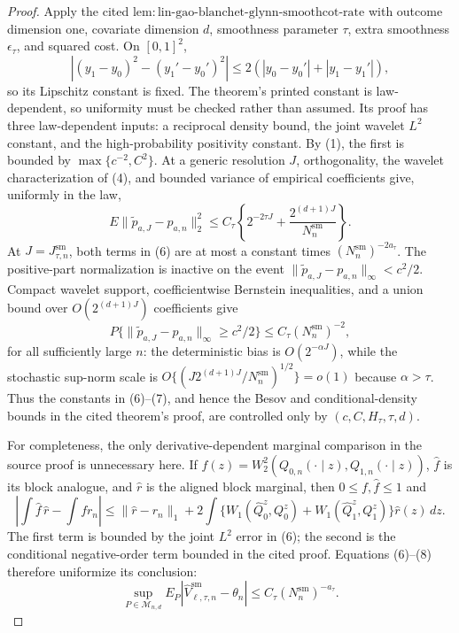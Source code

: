 \documentclass{article}
\begin{document}
\begin{proof}
Apply the cited \(\mathrm{lem{:}lin\text{-}gao\text{-}blanchet\text{-}glynn\text{-}smoothcot\text{-}rate}\) with outcome dimension one, covariate dimension \(d\), smoothness parameter \(\tau\), extra smoothness \(\epsilon_\tau\), and squared cost. On \([0,1]^2\),
\[
|(y_1-y_0)^2-(y_1'-y_0')^2|
\le2(|y_0-y_0'|+|y_1-y_1'|),                                      \tag{5}
\]
so its Lipschitz constant is fixed. The theorem's printed constant is law-dependent, so uniformity must be checked rather than assumed. Its proof has three law-dependent inputs: a reciprocal density bound, the joint wavelet \(L^2\) constant, and the high-probability positivity constant. By (1), the first is bounded by \(\max\{c^{-2},C^2\}\). At a generic resolution \(J\), orthogonality, the wavelet characterization of (4), and bounded variance of empirical coefficients give, uniformly in the law,
\[
E\|\widetilde p_{a,J}-p_{a,n}\|_2^2
\le C_\tau\left\{2^{-2\tau J}+\frac{2^{(d+1)J}}{N_n^{\mathrm{sm}}}\right\}. \tag{6}
\]
At \(J=J_{\tau,n}^{\mathrm{sm}}\), both terms in (6) are at most a constant times \((N_n^{\mathrm{sm}})^{-2a_\tau}\). The positive-part normalization is inactive on the event \(\|\widetilde p_{a,J}-p_{a,n}\|_\infty<c^2/2\). Compact wavelet support, coefficientwise Bernstein inequalities, and a union bound over \(O(2^{(d+1)J})\) coefficients give
\[
P\{\|\widetilde p_{a,J}-p_{a,n}\|_\infty\ge c^2/2\}
\le C_\tau(N_n^{\mathrm{sm}})^{-2},                               \tag{7}
\]
for all sufficiently large \(n\): the deterministic bias is \(O(2^{-\alpha J})\), while the stochastic sup-norm scale is \(O\{(J2^{(d+1)J}/N_n^{\mathrm{sm}})^{1/2}\}=o(1)\) because \(\alpha>\tau\). Thus the constants in (6)--(7), and hence the Besov and conditional-density bounds in the cited theorem's proof, are controlled only by \((c,C,H_\tau,\tau,d)\).

For completeness, the only derivative-dependent marginal comparison in the source proof is unnecessary here. If \(f(z)=W_2^2(Q_{0,n}(\cdot\mid z),Q_{1,n}(\cdot\mid z))\), \(\widehat f\) is its block analogue, and \(\widehat r\) is the aligned block marginal, then \(0\le f,\widehat f\le1\) and
\[
\left|\int\widehat f\,\widehat r-\int f r_n\right|
\le\|\widehat r-r_n\|_1+
2\int\{W_1(\widehat Q_0^z,Q_0^z)+W_1(\widehat Q_1^z,Q_1^z)\}\widehat r(z)\,dz. \tag{8}
\]
The first term is bounded by the joint \(L^2\) error in (6); the second is the conditional negative-order term bounded in the cited proof. Equations (6)--(8) therefore uniformize its conclusion:
\[
\sup_{P\in\mathcal M_{n,d}}
E_P|\widehat V_{\ell,\tau,n}^{\mathrm{sm}}-\theta_n|
\le C_\tau(N_n^{\mathrm{sm}})^{-a_\tau}.                           \tag{9}
\]


\end{proof}
\end{document}
